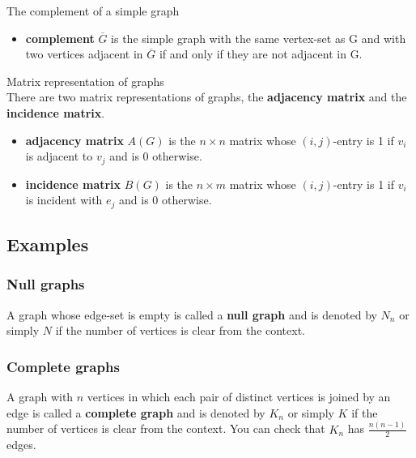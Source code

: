 \documentclass[12pt,a4paper]{ctexart}
\begin{document}
\begin{center}
    \colorbox{mygrey}{\color{myred}The complement of a simple graph}
    \begin{itemize}
        \item \textbf{complement} $\overline{G}$ is the simple graph with the same vertex-set as G and with two vertices adjacent in $\overline{G}$ if and only if they are not adjacent in G.
    \end{itemize}
\end{center}

\begin{center}
    \colorbox{mygrey}{\color{myred}Matrix representation of graphs}
~\\
There are two matrix representations of graphs, the \textbf{adjacency matrix} and the \textbf{incidence matrix}.
    \begin{itemize}
        \item \textbf{adjacency matrix} $A(G)$ is the $n \times n$ matrix whose $(i,j)$-entry is 1 if $v_i$ is adjacent to $v_j$ and is 0 otherwise.
        \item \textbf{incidence matrix} $B(G)$ is the $n \times m$ matrix whose $(i,j)$-entry is 1 if $v_i$ is incident with $e_j$ and is 0 otherwise.
    \end{itemize}
\end{center}

\subsection{Examples}

\subsubsection{Null graphs}
A graph whose edge-set is empty is called a \textbf{null graph} 
and is denoted by $N_n$ or simply $N$ if the number of vertices is clear from the context.

\subsubsection{Complete graphs}
A graph with $n$ vertices in which each pair of distinct vertices is joined by an edge is 
called a \textbf{complete graph} and is denoted by $K_n$ or simply $K$ if the number of vertices 
is clear from the context. You can check that $K_n$ has $\frac{n(n-1)}{2}$ edges.
\end{document}
